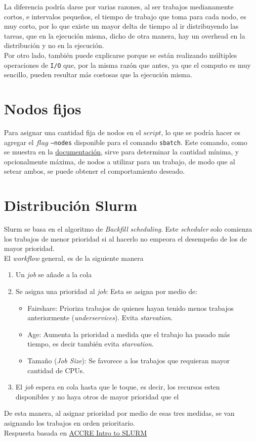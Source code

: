 \documentclass[letterpaper,10pt]{article}
\begin{document}
La diferencia podría darse por varias razones, al ser trabajos medianamente cortos, e intervalos pequeños, el tiempo de trabajo que toma para cada nodo, es muy corto, por lo que existe un mayor delta de tiempo al ir distribuyendo las tareas, que en la ejecución misma, dicho de otra manera, hay un overhead en la distribución y no en la ejecución.\\

Por otro lado, también puede explicarse porque se están realizando múltiples operaciones de \texttt{I/O} que, por la misma razón que antes, ya que el computo es muy sencillo, pueden resultar más costosas que la ejecución misma.

\section{Nodos fijos}
Para asignar una cantidad fija de nodos en el $script$,  lo que se podría hacer es agregar el $flag$ \texttt{--nodes} disponible para el comando \texttt{sbatch}. Este comando, como se muestra en la \href{https://slurm.schedmd.com/sbatch.html}{documentación}, sirve para determinar la cantidad mínima, y opcionalmente máxima, de nodos a utilizar para un trabajo, de modo que al setear ambos, se puede obtener el comportamiento deseado.

\section{Distribución Slurm}

Slurm se basa en el algoritmo de \textit{Backfill scheduling}. Este \textit{scheduler} solo comienza los trabajos de menor prioridad si al hacerlo no empeora el desempeño de los de mayor prioridad. \\

El \textit{workflow} general, es de la siguiente manera

\begin{enumerate}
\item Un \textit{job} se añade a la cola
\item Se asigna una prioridad al \textit{job}:
Esta se asigna por medio de:
\begin{itemize}
\item Fairshare: Prioriza trabajos de quienes hayan tenido menos trabajos anteriormente (\textit{underservices}). Evita \textit{starvation}.
\item Age: Aumenta la prioridad a medida que el trabajo ha pasado más tiempo, es decir también evita \textit{starvation}.
\item Tamaño (\textit{Job Size}): Se favorece a los trabajos que requieran mayor cantidad de CPUs.
\end{itemize}
\item El \textit{job} espera en cola hasta que le toque, es decir, los recursos esten disponibles y no haya otros de mayor prioridad que el
\end{enumerate}

De esta manera, al asignar prioridad por medio de esas tres medidas, se van asignando los trabajos en orden prioritario.\\

Respuesta basada en \href{https://www.accre.vanderbilt.edu/wp-content/uploads/2016/08/intro_to_slurm.pdf}{ACCRE Intro to SLURM}
\end{document}
